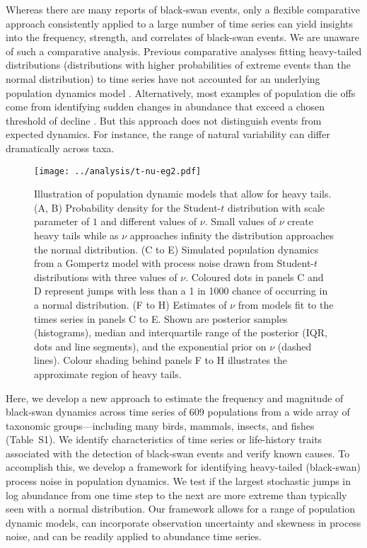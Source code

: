 \documentclass[9pt,twocolumn,twoside]{pnas-new}
\begin{document}
Whereas there are many reports of black-swan events,
only a flexible comparative approach consistently applied
to a large number of time series can yield insights into the frequency, strength,
and correlates of black-swan events.
We are unaware of such a comparative analysis.
Previous comparative analyses fitting
heavy-tailed distributions
(distributions with higher probabilities of extreme events
than the normal distribution)
to time series
have not accounted for an underlying population dynamics model
\cite{keitt1998, allen2001, halley2002, segura2013}.
Alternatively, most examples of population die offs come from identifying
sudden changes in abundance that exceed a chosen threshold of decline
\cite{young1994, gerber2001, reed2003, fey2015}.
But this approach
does not distinguish events from
expected dynamics.
For instance, the range of natural variability
can differ dramatically across taxa.

\begin{figure*}[htb]
\centering
\texttt{[image: ../analysis/t-nu-eg2.pdf]}
\caption{ Illustration of population dynamic models that allow for heavy
tails. (A, B) Probability density for the Student-$t$
distribution with scale parameter of $1$ and different values of \(\nu\). Small
values of \(\nu\) create heavy tails while as \(\nu\) approaches infinity the
distribution approaches the normal distribution. (C to E)
Simulated population dynamics from a Gompertz model with process noise drawn
from Student-$t$ distributions with three values of \(\nu\). Coloured dots in
panels C and D represent jumps with less than a 1 in 1000
chance of occurring in a normal distribution. (F to H)
Estimates of \(\nu\) from models fit to the times series in panels C to
E. Shown are posterior samples (histograms), median and interquartile
range of the posterior (IQR, dots and line segments), and the exponential prior
on \(\nu\) (dashed lines). Colour shading behind panels F to H
illustrates the approximate region of heavy tails.}
\label{fig:1}
\end{figure*}



Here, we develop a new approach to estimate the frequency and magnitude of
black-swan dynamics across time series of 609 populations from a wide array of
taxonomic groups---including many  birds, mammals, insects, and fishes
(Table~S1). We identify characteristics of time series or
life-history traits associated with the detection of black-swan events and
verify known causes. To accomplish this, we develop a framework for identifying
heavy-tailed (black-swan) process noise in population dynamics.
We test if the largest stochastic jumps in log abundance from one time step to the next
are more extreme than typically seen with a normal distribution. Our framework
allows for a range of population dynamic models, can incorporate observation
uncertainty and skewness in process noise, and can be readily applied to
abundance time series.
\end{document}
